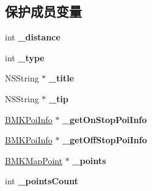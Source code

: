 \subsection*{保护成员变量}
\begin{DoxyCompactItemize}
\item 
\hypertarget{interface_b_m_k_line_a2e7a14672b675d089fd2901295d25673}{int {\bfseries \-\_\-distance}}\label{interface_b_m_k_line_a2e7a14672b675d089fd2901295d25673}

\item 
\hypertarget{interface_b_m_k_line_a5fcb42fec4bf8715049776029312757c}{int {\bfseries \-\_\-type}}\label{interface_b_m_k_line_a5fcb42fec4bf8715049776029312757c}

\item 
\hypertarget{interface_b_m_k_line_ae029128ffc699ec5b89103a80343cc6c}{N\-S\-String $\ast$ {\bfseries \-\_\-title}}\label{interface_b_m_k_line_ae029128ffc699ec5b89103a80343cc6c}

\item 
\hypertarget{interface_b_m_k_line_ac24f2b082099c8b2cf6d8f4de06047dc}{N\-S\-String $\ast$ {\bfseries \-\_\-tip}}\label{interface_b_m_k_line_ac24f2b082099c8b2cf6d8f4de06047dc}

\item 
\hypertarget{interface_b_m_k_line_a50f2f33f1f170718e3e1e421c83b47cb}{\hyperlink{interface_b_m_k_poi_info}{B\-M\-K\-Poi\-Info} $\ast$ {\bfseries \-\_\-get\-On\-Stop\-Poi\-Info}}\label{interface_b_m_k_line_a50f2f33f1f170718e3e1e421c83b47cb}

\item 
\hypertarget{interface_b_m_k_line_a284c8a3e2d460bb47f53990b2f98fac4}{\hyperlink{interface_b_m_k_poi_info}{B\-M\-K\-Poi\-Info} $\ast$ {\bfseries \-\_\-get\-Off\-Stop\-Poi\-Info}}\label{interface_b_m_k_line_a284c8a3e2d460bb47f53990b2f98fac4}

\item 
\hypertarget{interface_b_m_k_line_a238759e096aa6b7fd31fb800a5baae7e}{\hyperlink{struct_b_m_k_map_point}{B\-M\-K\-Map\-Point} $\ast$ {\bfseries \-\_\-points}}\label{interface_b_m_k_line_a238759e096aa6b7fd31fb800a5baae7e}

\item 
\hypertarget{interface_b_m_k_line_ae85eada76152eedd34b6fb55f81bc21a}{int {\bfseries \-\_\-points\-Count}}\label{interface_b_m_k_line_ae85eada76152eedd34b6fb55f81bc21a}

\end{DoxyCompactItemize}
